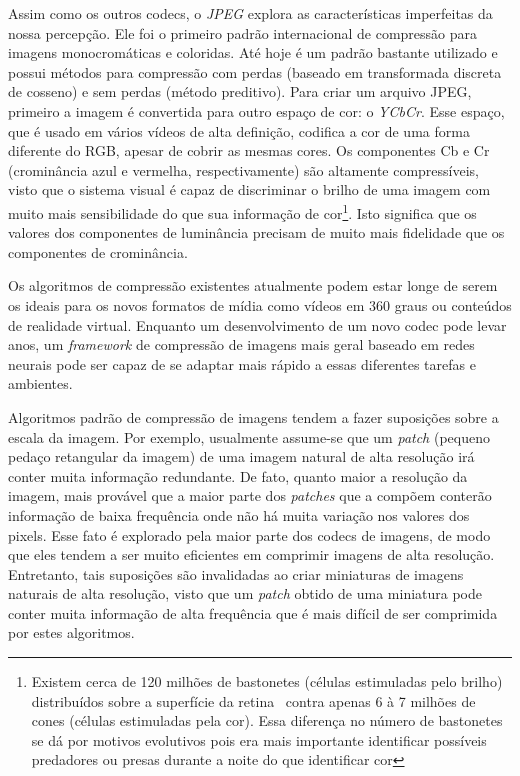 Assim como os outros codecs, o \textit{JPEG} explora as características imperfeitas da nossa percepção. Ele foi o primeiro padrão internacional de compressão para imagens monocromáticas e coloridas. Até hoje é um padrão bastante utilizado e possui métodos para compressão com perdas (baseado em transformada discreta de cosseno) e sem perdas (método preditivo). Para criar um arquivo JPEG, primeiro a imagem é convertida para outro espaço de cor: o \textit{YCbCr}. Esse espaço, que é usado em vários vídeos de alta definição, codifica a cor de uma forma diferente do RGB, apesar de cobrir as mesmas cores. Os componentes Cb e Cr (crominância azul e vermelha, respectivamente) são altamente compressíveis, visto que o sistema visual é capaz de discriminar o brilho de uma imagem com muito mais sensibilidade do que sua informação de cor\footnote{Existem cerca de 120 milhões de bastonetes (células estimuladas pelo brilho) distribuídos sobre a superfície da retina~\cite{olho} contra apenas 6 à 7 milhões de cones (células estimuladas pela cor). Essa diferença no número de bastonetes se dá por motivos evolutivos pois era mais importante identificar possíveis predadores ou presas durante a noite do que identificar cor}. Isto significa que os valores dos componentes de luminância precisam de muito mais fidelidade que os componentes de crominância.

Os algoritmos de compressão existentes atualmente podem estar longe de serem os ideais para os novos formatos de mídia como vídeos em 360 graus ou conteúdos de realidade virtual. Enquanto um desenvolvimento de um novo codec pode levar anos, um \textit{framework} de compressão de imagens mais geral baseado em redes neurais pode ser capaz de se adaptar mais rápido a essas diferentes tarefas e ambientes.

Algoritmos padrão de compressão de imagens tendem a fazer suposições sobre a escala da imagem. Por exemplo, usualmente assume-se que um \textit{patch} (pequeno pedaço retangular da imagem) de uma imagem natural de alta resolução irá conter muita informação redundante. De fato, quanto maior a resolução da imagem, mais provável que a maior parte dos \textit{patches} que a compõem conterão informação de baixa frequência onde não há muita variação nos valores dos pixels. Esse fato é explorado pela maior parte dos codecs de imagens, de modo que eles tendem a ser muito eficientes em comprimir imagens de alta resolução. Entretanto, tais suposições são invalidadas ao criar miniaturas de imagens naturais de alta resolução, visto que um \textit{patch} obtido de uma miniatura pode conter muita informação de alta frequência que é mais difícil de ser comprimida por estes algoritmos. 

